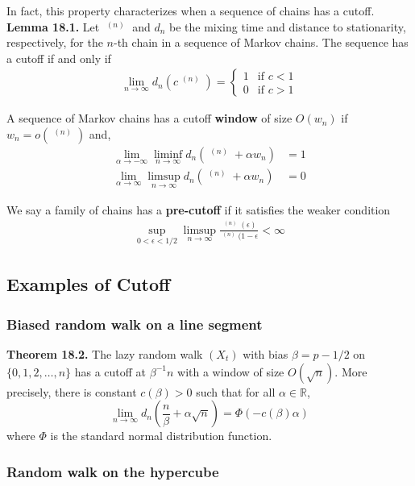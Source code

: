 \documentclass[12pt]{article}
\DeclareMathOperator*{\mix}{t_{\text{mix}}}
\begin{document}
In fact, this property characterizes when a sequence of chains has a cutoff.\\

\textbf{Lemma 18.1.} Let $\mix^{(n)}$ and $d_n$ be the mixing time and distance to stationarity, respectively, for the $n$-th chain in a sequence of Markov chains. The sequence has a cutoff if and only if 
\begin{align*}
\lim_{n \to \infty} d_n(c \mix^{(n)}) = \begin{cases}
1 & \text{if } c < 1\\
0 & \text{if } c > 1
\end{cases}
\end{align*}

A sequence of Markov chains has a cutoff \textbf{window} of size $O(w_n)$ if $w_n = o(\mix^{(n)})$ and,
\begin{align*}
\lim_{\alpha \to -\infty} \liminf_{n \to \infty} d_n (\mix^{(n)} + \alpha w_n) &= 1\\
\lim_{\alpha \to \infty} \limsup_{n \to \infty} d_n (\mix^{(n)} + \alpha w_n) &= 0
\end{align*}

We say a family of chains has a \textbf{pre-cutoff} if it satisfies the weaker condition
\begin{align*}
\sup_{0 < \epsilon < 1/2} \limsup_{n \to \infty} \frac{\mix^{(n)}(\epsilon)}{\mix^{(n)}(1 - \epsilon} < \infty
\end{align*}

\subsection{Examples of Cutoff}

\subsubsection{Biased random walk on a line segment}

\textbf{Theorem 18.2.} The lazy random walk $(X_t)$ with bias $\beta = p - 1/2$ on $\{0, 1, 2, \ldots, n\}$ has a cutoff at $\beta^{-1}n$ with a window of size $O(\sqrt{n})$. More precisely, there is constant $c(\beta) > 0$ such that for all $\alpha \in \mathbb{R}$, $$\lim_{n \to \infty} d_n \left(\frac{n}{\beta} + \alpha \sqrt{n} \right) = \Phi(-c(\beta)\alpha)$$ where $\Phi$ is the standard normal distribution function.

\subsubsection{Random walk on the hypercube}
\end{document}
